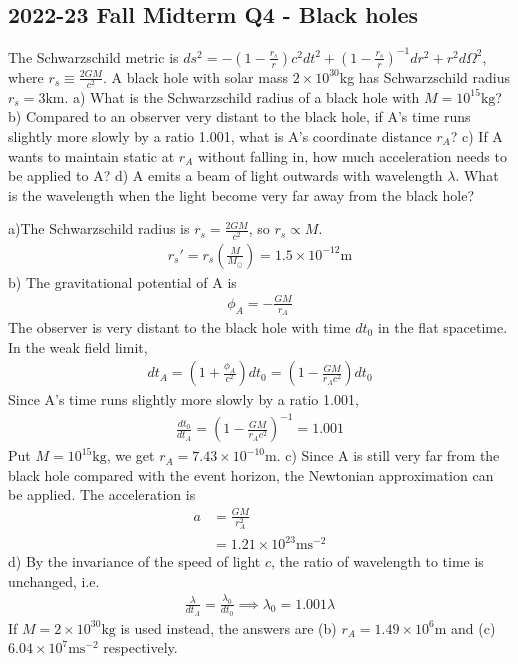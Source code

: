 \documentclass[12pt]{book} %
\numberwithin{equation}{chapter}
\def\l{\lambda}
\def\W{\Omega}
\begin{document}
\subsection*{2022-23 Fall Midterm Q4 - Black holes}
The Schwarzschild metric is $ds^{2}=-\left(1-\frac{r_{s}}{r}\right)c^{2}dt^{2}+\left(1-\frac{r_{s}}{r}\right)^{-1}dr^{2}+r^{2}d\W^{2}$, where $r_{s}\equiv\frac{2GM}{c^{2}}$. A black hole with solar mass $2\times10^{30}$kg has Schwarzschild radius $r_{s}=3\text{km}$.\bigskip\newline
a) What is the Schwarzschild radius of a black hole with $M=10^{15}\text{kg}$?\bigskip\newline
b) Compared to an observer very distant to the black hole, if A's time runs slightly more slowly by a ratio 1.001, what is A's coordinate distance $r_{A}$?\bigskip\newline
c) If A wants to maintain static at $r_{A}$ without falling in, how much acceleration needs to be applied to A?\bigskip\newline
d) A emits a beam of light outwards with wavelength $\l$. What is the wavelength when the light become very far away from the black hole?
\begin{solbox}
a)The Schwarzschild radius is $r_{s}=\frac{2GM}{c^2}$, so $r_{s}\propto M$.
\begin{align*}
    r_{s}'=r_{s}\left(\frac{M}{M_{\odot}}\right)=1.5\times10^{-12}\text{m}
\end{align*}
b) The gravitational potential of A is
\begin{align*}
    \phi_{A}=-\frac{GM}{r_{A}}
\end{align*}
The observer is very distant to the black hole with time $dt_{0}$ in the flat spacetime. In the weak field limit,
\begin{align*}
dt_{A}=\left(1+\frac{\phi_{A}}{c^{2}}\right)dt_{0}=\left(1-\frac{GM}{r_{A}c^{2}}\right)dt_{0}
\end{align*}
Since A’s time runs slightly more slowly by a ratio 1.001,
\begin{align*}
\frac{dt_{0}}{dt_{A}}=\left(1-\frac{GM}{r_{A}c^{2}}\right)^{-1}=1.001
\end{align*}
Put $M=10^{15}\text{kg}$, we get $r_{A}=7.43\times10^{-10}\text{m}$.\bigskip\newline
c) Since A is still very far from the black hole compared with the event horizon, the Newtonian
approximation can be applied. The acceleration is
\begin{align*}
a&=\frac{GM}{r_{A}^{2}}\\
&=1.21\times10^{23}\text{m}\text{s}^{-2}
\end{align*}
d) By the invariance of the speed of light $c$, the ratio of wavelength to time is unchanged, i.e.
\begin{align*}
    \frac{\l}{dt_{A}}=\frac{\l_{0}}{dt_{0}}\implies \l_{0}=1.001\l
\end{align*}
If $M=2\times10^{30}\text{kg}$ is used instead, the answers are (b) $r_{A}=1.49\times10^{6}\text{m}$ and (c) $6.04\times10^{7}\text{m}\text{s}^{-2}$ respectively.
\end{solbox}
\end{document}
